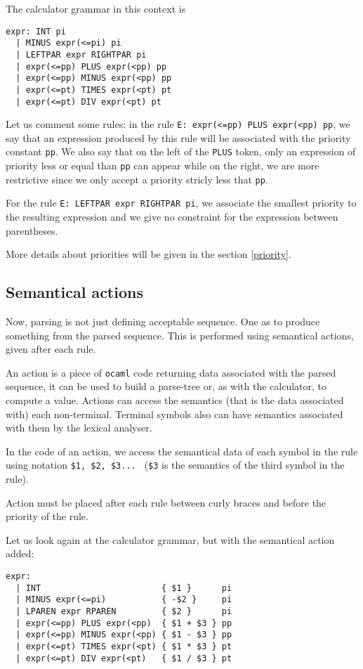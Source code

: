 \documentclass[12pt]{article}
\begin{document}
{The calculator grammar in this context is 

\begin{verbatim}
expr: INT pi 
  | MINUS expr(<=pi) pi 
  | LEFTPAR expr RIGHTPAR pi
  | expr(<=pp) PLUS expr(<pp) pp
  | expr(<=pp) MINUS expr(<pp) pp
  | expr(<=pt) TIMES expr(<pt) pt
  | expr(<=pt) DIV expr(<pt) pt
\end{verbatim}

Let us comment some rules: in the rule  
\verb#E: expr(<=pp) PLUS expr(<pp) pp#, 
we say that an expression produced by this rule will be associated with
the priority constant \verb#pp#. We also say that on the left of the
\verb#PLUS#
token, only an expression of priority less or equal than \verb#pp# can
appear while on the right, we are more restrictive since we only
accept a priority stricly less that \verb#pp#.

For the rule \verb#E: LEFTPAR expr RIGHTPAR pi#, we associate the
smallest priority to the resulting expression and we give no
constraint for the expression between parentheses.

More details about priorities will be given in the section \ref{priority}.

\subsection{Semantical actions}\label{actions}

Now, parsing is not just defining acceptable sequence. One as to
produce something from the parsed sequence. This is performed using
semantical actions, given after each rule.

 An action is a piece of
\verb#ocaml# code returning data associated with the parsed sequence, it can
be used to build a parse-tree or, as with the calculator, to compute a value.
Actions can access the semantics (that is the data
associated with) each non-terminal. Terminal symbols also can have
semantics associated with them by the lexical analyser. 

In the code of
an action, we access the semantical data of each symbol in the rule
using notation \verb#$1, $2, $3... # (\verb#$3# is the semantics of 
the third symbol in the rule).

Action must be placed after each rule between curly braces and before
the priority of the rule.

Let us look again at the calculator grammar, but with the
semantical action added:

\begin{verbatim}
expr:
  | INT                        { $1 }      pi
  | MINUS expr(<=pi)           { -$2 }     pi
  | LPAREN expr RPAREN         { $2 }      pi
  | expr(<=pp) PLUS expr(<pp)  { $1 + $3 } pp
  | expr(<=pp) MINUS expr(<pp) { $1 - $3 } pp
  | expr(<=pt) TIMES expr(<pt) { $1 * $3 } pt
  | expr(<=pt) DIV expr(<pt)   { $1 / $3 } pt
\end{verbatim}

}
\end{document}
